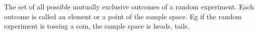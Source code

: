 The set of all possible mutually exclusive outcomes of a random experiment.
Each outcome is called an element or a point of the sample space. Eg
if the random experiment is tossing a coin, the sample space is {heads, tails}.